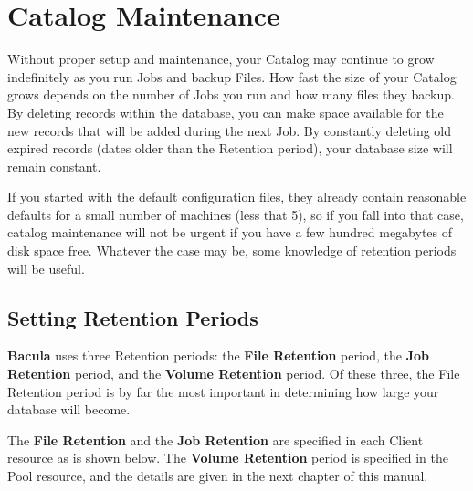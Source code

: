 
\section*{Catalog Maintenance}
\label{_ChapterStart12}

Without proper setup and maintenance, your Catalog may continue to grow
indefinitely as you run Jobs and backup Files. How fast the size of your
Catalog grows depends on the number of Jobs you run and how many files they
backup. By deleting records within the database, you can make space available
for the new records that will be added during the next Job. By constantly
deleting old expired records (dates older than the Retention period), your
database size will remain constant. 

If you started with the default configuration files, they already contain
reasonable defaults for a small number of machines (less that 5), so if you
fall into that case, catalog maintenance will not be urgent if you have a few
hundred megabytes of disk space free. Whatever the case may be, some knowledge
of retention periods will be useful. 
\label{Retention}

\subsection*{Setting Retention Periods}

{\bf Bacula} uses three Retention periods: the {\bf File Retention} period,
the {\bf Job Retention} period, and the {\bf Volume Retention} period. Of
these three, the File Retention period is by far the most important in
determining how large your database will become. 

The {\bf File Retention} and the {\bf Job Retention} are specified in each
Client resource as is shown below. The {\bf Volume Retention} period is
specified in the Pool resource, and the details are given in the next chapter
of this manual. 

